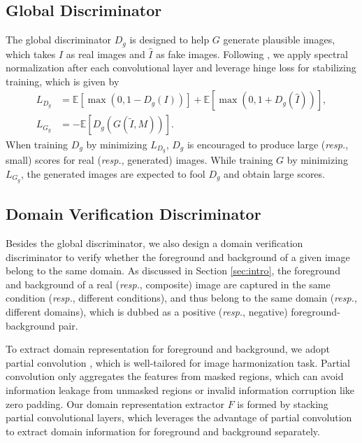 \documentclass[10pt,twocolumn,letterpaper]{article}
\begin{document}
\subsection{Global Discriminator}
The global discriminator $D_g$ is designed to help $G$ generate plausible images, which takes $I$ as real images and $\hat I$ as fake images. Following \cite{miyato2018spectral}, we apply spectral normalization after each convolutional layer and leverage hinge loss for stabilizing training, which is given by
\begin{equation}\label{eq:gan}
\begin{aligned}
L_{D_g} &= \mathbb{E}[\max(0, 1-D_g(I))] + \mathbb{E}[\max(0, 1+D_g(\hat{I}))] , \\
L_{G_g} &= -\mathbb{E}[D_g(G(\tilde I, M))].
\end{aligned}
\end{equation}
When training $D_g$ by minimizing $L_{D_g}$, $D_g$ is encouraged to produce large (\emph{resp.}, small) scores for real (\emph{resp.}, generated) images. While training $G$ by minimizing $L_{G_g}$, the generated images are expected to fool $D_g$ and obtain large scores.










\subsection{Domain Verification Discriminator}
Besides the global discriminator, we also design a domain verification discriminator to verify whether the foreground and background of a given image belong to the same domain. As discussed in Section \ref{sec:intro}, the foreground and background of a real (\emph{resp.}, composite) image are captured in the same condition (\emph{resp.}, different conditions), and thus belong to the same domain (\emph{resp.}, different domains), which is dubbed as a positive (\emph{resp.}, negative) foreground-background pair.

To extract domain representation for foreground and background, we adopt partial convolution \cite{Liu2018}, which is well-tailored for image harmonization task. Partial convolution only aggregates the features from masked regions, which can avoid information leakage from unmasked regions or invalid information corruption like zero padding. Our domain representation extractor $F$ is formed by stacking partial convolutional layers, which leverages the advantage of partial convolution to extract domain information for foreground and background separately.
\end{document}
